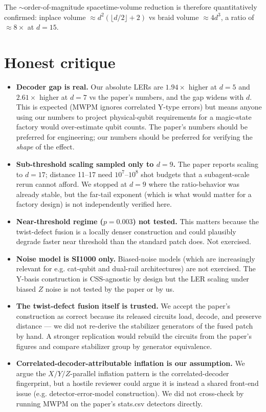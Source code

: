 \documentclass[11pt]{article}
\begin{document}
The $\sim$order-of-magnitude spacetime-volume reduction is therefore quantitatively
confirmed: inplace volume $\approx d^2(\lfloor d/2\rfloor+2)$ vs braid volume
$\approx 4d^3$, a ratio of $\approx 8\times$ at $d=15$.

\section{Honest critique}
\label{sec:critique}

\begin{itemize}
\item \textbf{Decoder gap is real.} Our absolute LERs are $1.94\times$ higher at
$d=5$ and $2.61\times$ higher at $d=7$ vs the paper's numbers, and the gap
widens with $d$. This is expected (MWPM ignores correlated Y-type errors) but
means anyone using our numbers to project physical-qubit requirements for a
magic-state factory would over-estimate qubit counts. The paper's numbers
should be preferred for engineering; our numbers should be preferred for
verifying the \emph{shape} of the effect.
\item \textbf{Sub-threshold scaling sampled only to $d=9$.} The paper reports
scaling to $d=17$; distance 11--17 need $10^7$--$10^8$ shot budgets that a
subagent-scale rerun cannot afford. We stopped at $d=9$ where the ratio-behavior
was already stable, but the far-tail exponent (which is what would matter for a
factory design) is not independently verified here.
\item \textbf{Near-threshold regime ($p=0.003$) not tested.} This matters because
the twist-defect fusion is a locally denser construction and could plausibly
degrade faster near threshold than the standard patch does. Not exercised.
\item \textbf{Noise model is SI1000 only.} Biased-noise models (which are
increasingly relevant for e.g. cat-qubit and dual-rail architectures) are not
exercised. The Y-basis construction is CSS-agnostic by design but the LER
scaling under biased $Z$ noise is not tested by the paper or by us.
\item \textbf{The twist-defect fusion itself is trusted.} We accept the paper's
construction as correct because its released circuits load, decode, and preserve
distance --- we did not re-derive the stabilizer generators of the fused patch
by hand. A stronger replication would rebuild the circuits from the paper's
figures and compare stabilizer group by generator equivalence.
\item \textbf{Correlated-decoder-attributable inflation is our assumption.} We
argue the $X/Y/Z$-parallel inflation pattern is the correlated-decoder
fingerprint, but a hostile reviewer could argue it is instead a shared
front-end issue (e.g. detector-error-model construction). We did not
cross-check by running MWPM on the paper's stats.csv detectors directly.
\end{itemize}
\end{document}
